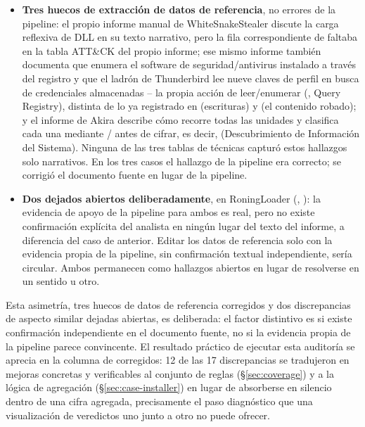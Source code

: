 \begin{itemize}
    ilustraci\'on directa de la relaci\'on entre confianza y precisi\'on
    examinada en \S\ref{sec:confidence-calibration}, no un
    contraejemplo de ella.
  \item \textbf{Tres huecos de extracci\'on de datos de referencia}, no
    errores de la pipeline: el propio informe manual de
    WhiteSnakeStealer discute la carga reflexiva de DLL en su texto
    narrativo, pero la fila correspondiente de  faltaba
    en la tabla ATT\&CK del propio informe; ese mismo informe tambi\'en
    documenta que  enumera el software de seguridad/antivirus
    instalado a trav\'es del registro y que el ladr\'on de Thunderbird
    lee nueve claves de perfil en busca de credenciales almacenadas --
    la propia acci\'on de leer/enumerar (, Query
    Registry), distinta de lo ya registrado en 
    (escrituras) y  (el contenido robado); y el
    informe de Akira describe c\'omo  recorre
    todas las unidades y clasifica cada una mediante
    / antes de cifrar, es
    decir,  (Descubrimiento de Informaci\'on del
    Sistema). Ninguna de las tres tablas de t\'ecnicas captur\'o estos
    hallazgos solo narrativos. En los tres casos el hallazgo de la
    pipeline era correcto; se corrigi\'o el documento fuente en lugar de
    la pipeline.
  \item \textbf{Dos dejados abiertos deliberadamente}, en RoningLoader
    (, ): la evidencia de apoyo de la
    pipeline para ambos es real, pero no existe confirmaci\'on expl\'icita
    del analista en ning\'un lugar del texto del informe, a diferencia
    del caso de  anterior. Editar los datos de
    referencia solo con la evidencia propia de la pipeline, sin
    confirmaci\'on textual independiente, ser\'ia circular. Ambos
    permanecen como hallazgos abiertos en lugar de resolverse en un
    sentido u otro.
\end{itemize}

Esta asimetr\'ia, tres huecos de datos de referencia corregidos y dos
discrepancias de aspecto similar dejadas abiertas, es deliberada: el
factor distintivo es si existe confirmaci\'on independiente en el
documento fuente, no si la evidencia propia de la pipeline parece
convincente. El resultado pr\'actico de ejecutar esta auditor\'ia se
aprecia en la columna de corregidos: 12 de las 17 discrepancias se
tradujeron en mejoras concretas y verificables al conjunto de reglas
(\S\ref{sec:coverage}) y a la l\'ogica de agregaci\'on
(\S\ref{sec:case-installer}) en lugar de absorberse en silencio dentro
de una cifra agregada, precisamente el paso diagn\'ostico que una
visualizaci\'on de veredictos uno junto a otro no puede ofrecer.

